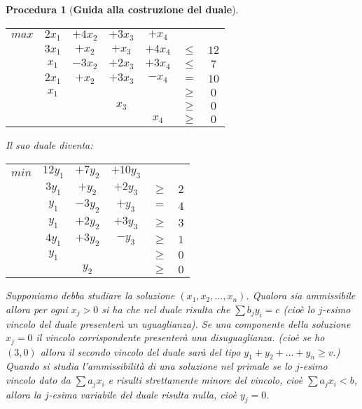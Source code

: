 \documentclass[10pt,a4paper,titlepage]{article}
\theoremstyle{break}
\theoremstyle{break}
\newtheorem{myProced}{Procedura}
\theoremstyle{break}
\begin{document}
\begin{myProced}[\textbf{Guida alla costruzione del duale}]
\begin{center}
\begin{tabular}{ccccccc}

$max$ & $2x_1$  & $+4x_2$ & $+3x_3$ & $+x_4$ && \\
      & $3x_1$  & $+x_2$  & $+x_3 $ & $+4x_4$ & $\leq$ & $12$ \\
      & $x_1$  & $-3x_2$  & $+2x_3 $ & $+3x_4$ & $\leq$ & $7$ \\
      & $2x_1$  & $+x_2$  & $+3x_3 $ & $-x_4$ & $=$ & $10$ \\
	
	  & $x_1$   &&&& $\geq$ & $0$ \\
	  &&& $x_3$ && $\geq$ & $0$ \\
	  &&&& $x_4$ & $\geq$ & $0$ \\
\end{tabular}
\end{center}

Il suo duale diventa:

\begin{center}
\begin{tabular}{cccccc}

$min$ & $12y_1$ & $+7y_2$ & $+10y_3$ && \\
      & $3y_1$  & $+y_2$  & $+2y_3 $ & $\geq$ & $2$ \\
	  & $y_1$   & $-3y_2$ & $+y_3 $  & $=$    & $4$ \\
	  & $y_1$   & $+2y_2$ & $+3y_3 $ & $\geq$ & $3$ \\
	  & $4y_1$  & $+3y_2$ & $-y_3 $ & $\geq$  & $1$ \\
	  
	  & $y_1$   &&& $\geq$ & $0$ \\
	  && $y_2$ && $\geq$ & $0$ \\
\end{tabular}
\end{center}

Supponiamo debba studiare la soluzione $(x_1,x_2,\dotsc,x_n)$. Qualora sia \textit{ammissibile} allora per ogni $x_j > 0$ si ha che nel duale risulta che $\sum b_{j}y_{i} = c$ (cioè lo $j$-esimo vincolo del duale presenterà un uguaglianza). Se una componente della soluzione $x_j = 0$ il vincolo corrispondente presenterà una disuguaglianza. (cioè se ho $(3,0)$ allora il secondo vincolo del duale sarà del tipo $y_1 +y_2 + \dotsc + y_n \geq v$.)  Quando si studia l'ammissibilità di una soluzione nel primale se lo $j$-esimo vincolo dato da $\sum a_{j}x_{i}$ e risulti strettamente minore del vincolo, cioè $\sum a_{j}x_{i} < b$, allora la $j$-esima variabile del duale risulta nulla, cioè $y_j = 0$.





\end{myProced}
\end{document}
